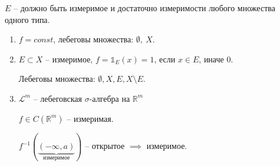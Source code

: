 \begin{remark}
    $E$ -- должно быть измеримое и достаточно измеримости любого множества одного типа.    
\end{remark}

\begin{example}
    \begin{enumerate}
        \item {
            $f = const$, лебеговы множества: $\emptyset, \ X$.
        }
        \item {
            $E \subset X$ -- измеримое, $f = \mathds{1}_E(x) = 1$, если $x \in E$, иначе $0$.

            Лебеговы множества: $\emptyset, X, E, X \setminus E$.
        }
        \item {
            $\mathscr{L}^m$ -- лебеговская $\sigma$-алгебра на $\mathbb{R}^m$

            $f \in C(\mathbb{R}^m)$ -- измеримая.

            $f^{-1}(\underbrace{(-\infty, a)}_{\text{измеримое}})$ -- открытое $\implies$ измеримое.
        }
    \end{enumerate}
\end{example}


